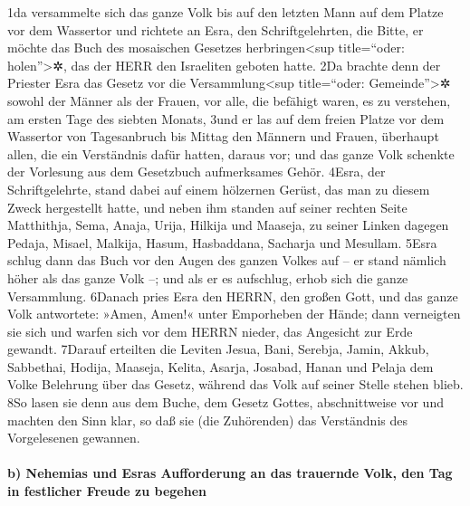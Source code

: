 1da versammelte sich das ganze Volk bis auf den letzten Mann auf dem
Platze vor dem Wassertor und richtete an Esra, den Schriftgelehrten, die
Bitte, er möchte das Buch des mosaischen Gesetzes
herbringen\textless sup title=``oder: holen''\textgreater✲, das der HERR
den Israeliten geboten hatte. 2Da brachte denn der Priester Esra das
Gesetz vor die Versammlung\textless sup title=``oder:
Gemeinde''\textgreater✲ sowohl der Männer als der Frauen, vor alle, die
befähigt waren, es zu verstehen, am ersten Tage des siebten Monats, 3und
er las auf dem freien Platze vor dem Wassertor von Tagesanbruch bis
Mittag den Männern und Frauen, überhaupt allen, die ein Verständnis
dafür hatten, daraus vor; und das ganze Volk schenkte der Vorlesung aus
dem Gesetzbuch aufmerksames Gehör. 4Esra, der Schriftgelehrte, stand
dabei auf einem hölzernen Gerüst, das man zu diesem Zweck hergestellt
hatte, und neben ihm standen auf seiner rechten Seite Matthithja, Sema,
Anaja, Urija, Hilkija und Maaseja, zu seiner Linken dagegen Pedaja,
Misael, Malkija, Hasum, Hasbaddana, Sacharja und Mesullam. 5Esra schlug
dann das Buch vor den Augen des ganzen Volkes auf -- er stand nämlich
höher als das ganze Volk --; und als er es aufschlug, erhob sich die
ganze Versammlung. 6Danach pries Esra den HERRN, den großen Gott, und
das ganze Volk antwortete: »Amen, Amen!« unter Emporheben der Hände;
dann verneigten sie sich und warfen sich vor dem HERRN nieder, das
Angesicht zur Erde gewandt. 7Darauf erteilten die Leviten Jesua, Bani,
Serebja, Jamin, Akkub, Sabbethai, Hodija, Maaseja, Kelita, Asarja,
Josabad, Hanan und Pelaja dem Volke Belehrung über das Gesetz, während
das Volk auf seiner Stelle stehen blieb. 8So lasen sie denn aus dem
Buche, dem Gesetz Gottes, abschnittweise vor und machten den Sinn klar,
so daß sie (die Zuhörenden) das Verständnis des Vorgelesenen gewannen.

\hypertarget{b-nehemias-und-esras-aufforderung-an-das-trauernde-volk-den-tag-in-festlicher-freude-zu-begehen}{%
\paragraph{b) Nehemias und Esras Aufforderung an das trauernde Volk, den
Tag in festlicher Freude zu
begehen}\label{b-nehemias-und-esras-aufforderung-an-das-trauernde-volk-den-tag-in-festlicher-freude-zu-begehen}}

